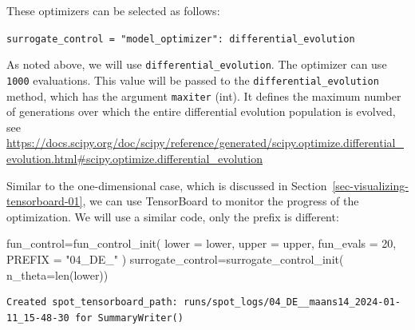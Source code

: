 \documentclass[
  letterpaper,
  DIV=11,
  numbers=noendperiod]{scrreprt}
\newenvironment{Shaded}{\begin{snugshade}}{\end{snugshade}}
\newcommand{\BuiltInTok}[1]{\textcolor[rgb]{0.00,0.23,0.31}{#1}}
\newcommand{\DecValTok}[1]{\textcolor[rgb]{0.68,0.00,0.00}{#1}}
\newcommand{\NormalTok}[1]{\textcolor[rgb]{0.00,0.23,0.31}{#1}}
\newcommand{\OperatorTok}[1]{\textcolor[rgb]{0.37,0.37,0.37}{#1}}
\newcommand{\StringTok}[1]{\textcolor[rgb]{0.13,0.47,0.30}{#1}}
\begin{document}
These optimizers can be selected as follows:

\texttt{surrogate\_control\ =\ "model\_optimizer":\ differential\_evolution}

As noted above, we will use \texttt{differential\_evolution}. The
optimizer can use \texttt{1000} evaluations. This value will be passed
to the \texttt{differential\_evolution} method, which has the argument
\texttt{maxiter} (int). It defines the maximum number of generations
over which the entire differential evolution population is evolved, see
\url{https://docs.scipy.org/doc/scipy/reference/generated/scipy.optimize.differential_evolution.html\#scipy.optimize.differential_evolution}

\begin{tcolorbox}[enhanced jigsaw, left=2mm, opacitybacktitle=0.6, leftrule=.75mm, toptitle=1mm, opacityback=0, colback=white, rightrule=.15mm, colframe=quarto-callout-note-color-frame, title=\textcolor{quarto-callout-note-color}{\faInfo}\hspace{0.5em}{TensorBoard}, toprule=.15mm, coltitle=black, bottomrule=.15mm, bottomtitle=1mm, colbacktitle=quarto-callout-note-color!10!white, titlerule=0mm, breakable, arc=.35mm]

Similar to the one-dimensional case, which is discussed in
Section~\ref{sec-visualizing-tensorboard-01}, we can use TensorBoard to
monitor the progress of the optimization. We will use a similar code,
only the prefix is different:

\begin{Shaded}
\begin{Highlighting}[]
\NormalTok{fun\_control}\OperatorTok{=}\NormalTok{fun\_control\_init(}
\NormalTok{                    lower }\OperatorTok{=}\NormalTok{ lower,}
\NormalTok{                    upper }\OperatorTok{=}\NormalTok{ upper,}
\NormalTok{                    fun\_evals }\OperatorTok{=} \DecValTok{20}\NormalTok{,}
\NormalTok{                    PREFIX }\OperatorTok{=} \StringTok{"04\_DE\_"}
\NormalTok{                    )}
\NormalTok{surrogate\_control}\OperatorTok{=}\NormalTok{surrogate\_control\_init(}
\NormalTok{                    n\_theta}\OperatorTok{=}\BuiltInTok{len}\NormalTok{(lower))}
\end{Highlighting}
\end{Shaded}

\begin{verbatim}
Created spot_tensorboard_path: runs/spot_logs/04_DE__maans14_2024-01-11_15-48-30 for SummaryWriter()
\end{verbatim}

\end{tcolorbox}
\end{document}
